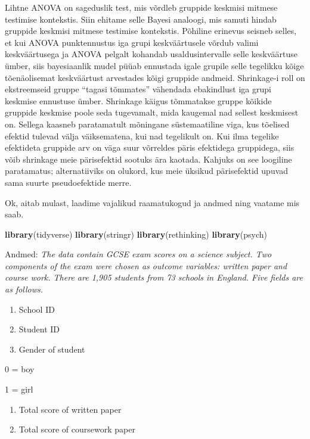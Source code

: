 \documentclass[]{book}
\newenvironment{Shaded}{\begin{snugshade}}{\end{snugshade}}
\newcommand{\KeywordTok}[1]{\textcolor[rgb]{0.13,0.29,0.53}{\textbf{#1}}}
\newcommand{\NormalTok}[1]{#1}
\begin{document}
Lihtne ANOVA on sageduslik test, mis võrdleb gruppide keskmisi mitmese
testimise kontekstis. Siin ehitame selle Bayesi analoogi, mis samuti
hindab gruppide keskmisi mitmese testimise kontekstis. Põhiline erinevus
seisneb selles, et kui ANOVA punktennustus iga grupi keskväärtusele
võrdub valimi keskväärtusega ja ANOVA pelgalt kohandab usaldusintervalle
selle keskväärtuse ümber, siis bayesiaanlik mudel püüab ennustada igale
grupile selle tegelikku kõige tõenäolisemat keskväärtust arvestades
kõigi gruppide andmeid. Shrinkage-i roll on ekstreemseid gruppe ``tagasi
tõmmates'' vähendada ebakindlust iga grupi keskmise ennustuse ümber.
Shrinkage käigus tõmmatakse gruppe kõikide gruppide keskmise poole seda
tugevamalt, mida kaugemal nad sellest keskmisest on. Sellega kaasneb
paratamatult mõningane süstemaatiline viga, kus tõelised efektid tulevad
välja väiksematena, kui nad tegelikult on. Kui ilma tegelike efektideta
gruppide arv on väga suur võrreldes päris efektidega gruppidega, siis
võib shrinkage meie pärisefektid sootuks ära kaotada. Kahjuks on see
loogiline paratamatus; alternatiiviks on olukord, kus meie üksikud
pärisefektid upuvad sama suurte pseudoefektide merre.

Ok, aitab mulast, laadime vajalikud raamatukogud ja andmed ning vaatame
mis saab.

\begin{Shaded}
\begin{Highlighting}[]
\KeywordTok{library}\NormalTok{(tidyverse)}
\KeywordTok{library}\NormalTok{(stringr)}
\KeywordTok{library}\NormalTok{(rethinking)}
\KeywordTok{library}\NormalTok{(psych)}
\end{Highlighting}
\end{Shaded}

Andmed: \emph{The data contain GCSE exam scores on a science subject.
Two components of the exam were chosen as outcome variables: written
paper and course work. There are 1,905 students from 73 schools in
England. Five fields are as follows.}

\begin{enumerate}
\def\labelenumi{\arabic{enumi}.}
\item
  School ID
\item
  Student ID
\item
  Gender of student
\end{enumerate}

0 = boy

1 = girl

\begin{enumerate}
\def\labelenumi{\arabic{enumi}.}
\setcounter{enumi}{3}
\item
  Total score of written paper
\item
  Total score of coursework paper
\end{enumerate}
\end{document}

